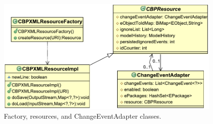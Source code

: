 \begin{figure}[th]
  \centering
  \includegraphics[width=\linewidth]{resources}
  \caption{Factory, resources, and ChangeEventAdapter classes.}
  \label{fig:resources}
\end{figure}

%
%

